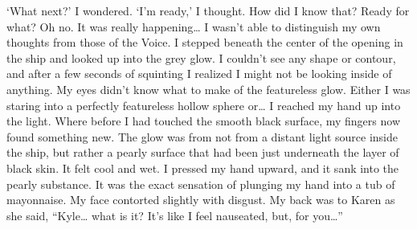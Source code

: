 \documentclass[a4paper]{article}
\begin{document}
‘What next?’ I wondered.
‘I’m ready,’ I thought.
How did I know that? Ready for what? Oh no. It was really happening… I wasn’t able to distinguish my own thoughts from those of the Voice.
I stepped beneath the center of the opening in the ship and looked up into the grey glow. I couldn’t see any shape or contour, and after a few seconds of squinting I realized I might not be looking inside of anything.
My eyes didn’t know what to make of the featureless glow. Either I was staring into a perfectly featureless hollow sphere or…
I reached my hand up into the light. Where before I had touched the smooth black surface, my fingers now found something new. The glow was from not from a distant light source inside the ship, but rather a pearly surface that had been just underneath the layer of black skin. It felt cool and wet.
I pressed my hand upward, and it sank into the pearly substance. It was the exact sensation of plunging my hand into a tub of mayonnaise. My face contorted slightly with disgust.
My back was to Karen as she said, “Kyle… what is it? It’s like I feel nauseated, but, for you…”
\end{document}
